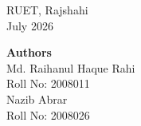 \vspace{4em}

\noindent
\begin{minipage}[t]{0.45\textwidth}
\begin{flushleft}
RUET, Rajshahi\\
July 2026 %
\end{flushleft}
\end{minipage}%
\hfill
\begin{minipage}[t]{0.5\textwidth}
\begin{flushright}
\textbf{Authors}\\
Md. Raihanul Haque Rahi\\
Roll No: 2008011\\[10pt]
Nazib Abrar\\
Roll No: 2008026
\end{flushright}
\end{minipage}
